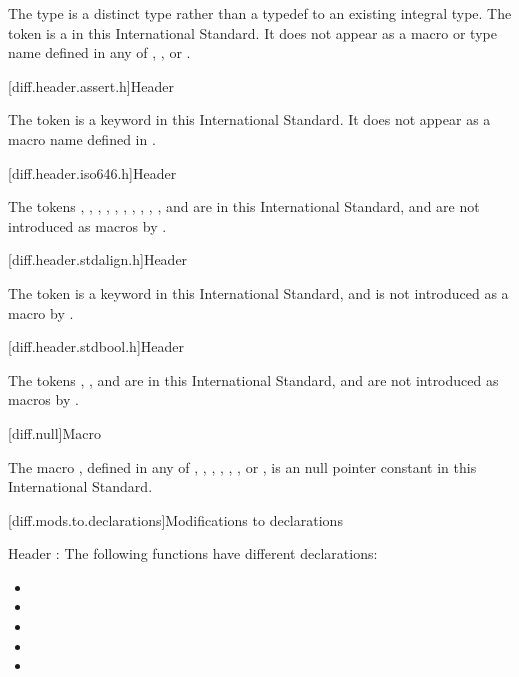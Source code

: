 \pnum
The type  is a distinct type rather than a typedef to an
existing integral type.
The token 
is a  in this International Standard.
It does not appear as a macro or type name defined in any of
,
,
or .

[diff.header.assert.h]{Header }
%

\pnum
The token  is a keyword in this International
Standard. It does not appear as a macro name defined
in .

[diff.header.iso646.h]{Header }

\pnum
The tokens
,
,
,
,
,
,
,
,
,
,
and
are  in this International
Standard,
and are not introduced as macros
by .

[diff.header.stdalign.h]{Header }
%

\pnum
The token  is a keyword in this International
Standard,
and is not introduced as a macro
by .

[diff.header.stdbool.h]{Header }
%

\pnum
The tokens , , and 
are  in this International Standard,
and are not introduced as macros
by .

[diff.null]{Macro }

\pnum
The macro
,
defined in any of
,
,
,
,
,
,
or ,
is an  \Cpp{} null pointer constant in
this International Standard.

[diff.mods.to.declarations]{Modifications to declarations}

\pnum
Header :
The following functions have different declarations:

\begin{itemize}
\item {}
\item {}
\item {}
\item {}
\item {}
\end{itemize}

